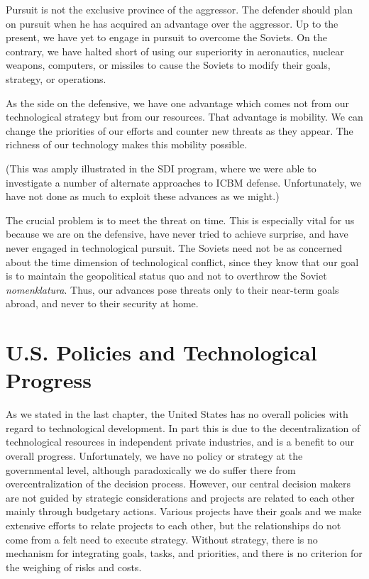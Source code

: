 Pursuit is not the exclusive province of the aggressor. The defender should plan on pursuit when he has acquired an advantage over the aggressor. Up to the present, we have yet to engage in pursuit to overcome the Soviets. On the contrary, we have halted short of using our superiority in aeronautics, nuclear weapons, computers, or missiles to cause the Soviets to modify their goals, strategy, or operations.

As the side on the defensive, we have one advantage which comes not from our technological strategy but from our resources. That advantage is mobility. We can change the priorities of our efforts and counter new threats as they appear. The richness of our technology makes this mobility possible.

(This was amply illustrated in the SDI program, where we were able to investigate a number of alternate approaches to ICBM defense. Unfortunately, we have not done as much to exploit these advances as we might.)

The crucial problem is to meet the threat on time. This is especially vital for us because we are on the defensive, have never tried to achieve surprise, and have never engaged in technological pursuit. The Soviets need not be as concerned about the time dimension of technological conflict, since they know that our goal is to maintain the geopolitical status quo and not to overthrow the Soviet \textit{nomenklatura}. Thus, our advances pose threats only to their near-term goals abroad, and never to their security at home.


\section{U.S. Policies and Technological Progress}
As we stated in the last chapter, the United States has no overall policies with regard to technological development. In part this is due to the decentralization of technological resources in independent private industries, and is a benefit to our overall progress. Unfortunately, we have no policy or strategy at the governmental level, although paradoxically we do suffer there from overcentralization of the decision process. However, our central decision makers are not guided by strategic considerations and projects are related to each other mainly through budgetary actions. Various projects have their goals and we make extensive efforts to relate projects to each other, but the relationships do not come from a felt need to execute strategy. Without strategy, there is no mechanism for integrating goals, tasks, and priorities, and there is no criterion for the weighing of risks and costs.

